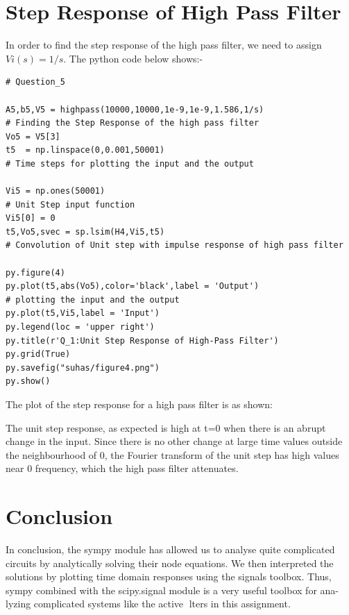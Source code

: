 \documentclass[11pt, a4paper]{article}
\begin{document}
\section*{Step Response of High Pass Filter}
In order to find the step response of the high pass filter, we need to assign $ Vi(s) = 1/s $. 
The python code below shows:-
\begin{verbatim}
# Question_5

A5,b5,V5 = highpass(10000,10000,1e-9,1e-9,1.586,1/s)                                     # Finding the Step Response of the high pass filter
Vo5 = V5[3]
t5  = np.linspace(0,0.001,50001)                                                           # Time steps for plotting the input and the output

Vi5 = np.ones(50001)                                                                     # Unit Step input function                                                          
Vi5[0] = 0
t5,Vo5,svec = sp.lsim(H4,Vi5,t5)                                                           # Convolution of Unit step with impulse response of high pass filter

py.figure(4) 
py.plot(t5,abs(Vo5),color='black',label = 'Output')                                       # plotting the input and the output
py.plot(t5,Vi5,label = 'Input')
py.legend(loc = 'upper right')
py.title(r'Q_1:Unit Step Response of High-Pass Filter')
py.grid(True)
py.savefig("suhas/figure4.png")
py.show()
\end{verbatim}
The plot of the step response for a high pass filter is as shown:

The unit step response, as expected is high at t=0 when there is an abrupt
change in the input. Since there is no other change at large time values outside
the neighbourhood of 0, the Fourier transform of the unit step has high values
near 0 frequency, which the high pass filter attenuates.

\section*{Conclusion}
In conclusion, the sympy module has allowed us to analyse quite complicated
circuits by analytically solving their node equations. We then interpreted the solutions by plotting time domain responses using the signals toolbox. Thus,
sympy combined with the scipy.signal module is a very useful toolbox for ana-
lyzing complicated systems like the active lters in this assignment.

  
\end{document}
